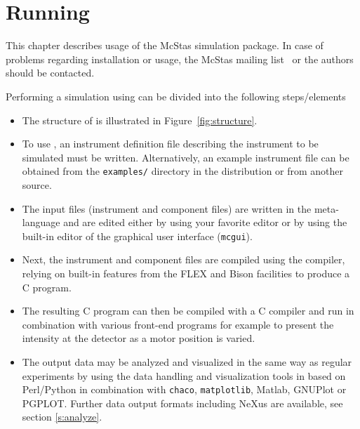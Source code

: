 
\chapter{Running \MCS}
\label{c:running}



This chapter describes usage of the McStas simulation package. 
In case of problems regarding installation or usage, the McStas mailing
list~\cite{mcstas_webpage} or the authors should be contacted.

Performing a simulation using \MCS can be divided into the following
steps/elements
\begin{itemize}
\item{The structure of \MCS is illustrated in
    Figure~\ref{fig:structure}.}
\item{To use \MCS, an instrument
definition file describing the instrument to be simulated must be
written. Alternatively, an example instrument file can be obtained
from the \verb+examples/+ directory in the distribution or from
another source.}
\item{The input files (instrument and component files) are written in the \MCS
meta-language and are edited either by using your favorite editor
or by using the built-in editor of the graphical user interface
(\texttt{mcgui}).}
\item{Next, the instrument and component files are compiled using the \MCS
compiler, relying on built-in features from the FLEX and Bison facilities to produce a C program.}
\item{The resulting C program can then be
compiled with a C compiler and run in combination with various
front-end programs for example to present the intensity at the
detector as a motor position is varied.}
\item{The output data may be analyzed and visualized in the same way as regular
    experiments by using the data handling and visualization tools in \MCS
    based on Perl/Python in combination with \verb+chaco+, \verb+matplotlib+,
    Matlab, GNUPlot or PGPLOT. Further data output formats including NeXus
    are available, see section \ref{s:analyze}.}
\end{itemize}


